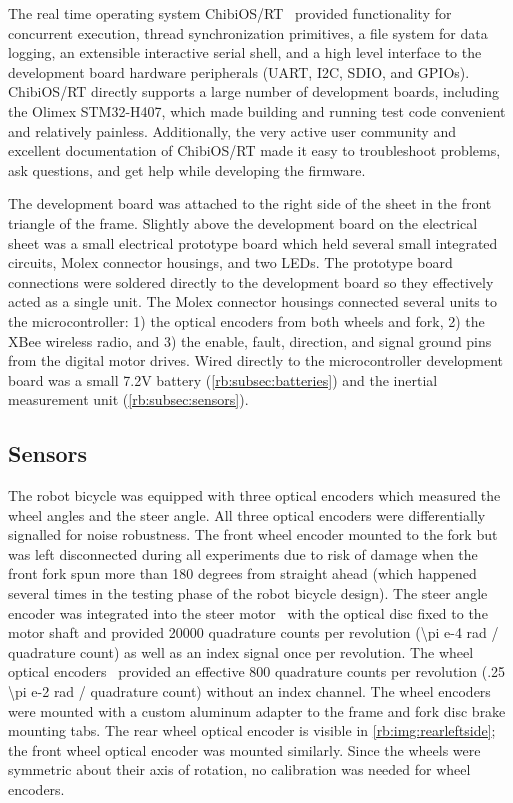 The real time operating system ChibiOS/RT~\cite{ChibiOS} provided functionality
for concurrent execution, thread synchronization primitives, a file system for
data logging, an extensible interactive serial shell, and a high level
interface to the development board hardware peripherals (UART, I2C, SDIO, and
GPIOs). ChibiOS/RT directly supports a large number of development boards,
including the Olimex STM32-H407, which made building and running test code
convenient and relatively painless.  Additionally, the very active user
community and excellent documentation of ChibiOS/RT made it easy to
troubleshoot problems, ask questions, and get help while developing the
firmware.

The development board was attached to the right side of the sheet in the front
triangle of the frame. Slightly above the development board on the electrical
sheet was a small electrical prototype board which held several small
integrated circuits, Molex connector housings, and two LEDs. The prototype
board connections were soldered directly to the development board so they
effectively acted as a single unit. The Molex connector housings connected
several units to the microcontroller: 1) the optical encoders from both wheels
and fork, 2) the XBee wireless radio, and 3) the enable, fault, direction, and
signal ground pins from the digital motor drives. Wired directly to the
microcontroller development board was a small 7.2V battery
(\autoref{rb:subsec:batteries}) and the inertial measurement unit
(\autoref{rb:subsec:sensors}).


\subsection{Sensors} \label{rb:subsec:sensors}
The robot bicycle was equipped with three optical encoders which measured the
wheel angles and the steer angle. All three optical encoders were
differentially signalled for noise robustness. The front wheel encoder mounted
to the fork but was left disconnected during all experiments due to risk of
damage when the front fork spun more than 180 degrees from straight ahead
(which happened several times in the testing phase of the robot bicycle
design). The steer angle encoder was integrated into the steer
motor~\cite{TeknicM3441} with the optical disc fixed to the motor shaft and
provided 20000 quadrature counts per revolution (\num{\pi e-4} rad / quadrature
count) as well as an index signal once per revolution. The wheel optical
encoders~\cite{USDigitalH5} provided an effective 800 quadrature counts per
revolution (\num{.25 \pi e-2} rad / quadrature count) without an index channel. The
wheel encoders were mounted with a custom aluminum adapter to the frame and
fork disc brake mounting tabs. The rear wheel optical encoder is visible in
\autoref{rb:img:rearleftside}; the front wheel optical encoder was mounted
similarly. Since the wheels were symmetric about their axis of rotation, no
calibration was needed for wheel encoders.

